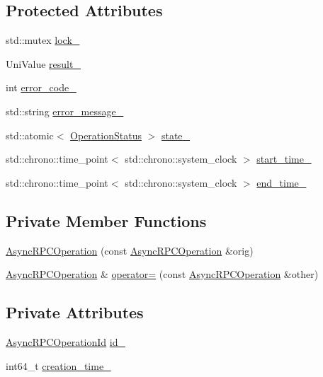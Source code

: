 \subsection*{Protected Attributes}
\begin{DoxyCompactItemize}
\item 
std\+::mutex \mbox{\hyperlink{class_async_r_p_c_operation_a3b2c3593ad11003b628c95dffbbea6d1}{lock\+\_\+}}
\item 
Uni\+Value \mbox{\hyperlink{class_async_r_p_c_operation_abcb878365261b9f28b460d697b39cc12}{result\+\_\+}}
\item 
int \mbox{\hyperlink{class_async_r_p_c_operation_a15823397370b4893f7e0e7aa88efd89e}{error\+\_\+code\+\_\+}}
\item 
std\+::string \mbox{\hyperlink{class_async_r_p_c_operation_a07644a57fdaf6eeb83fcfbeba4f1b3e0}{error\+\_\+message\+\_\+}}
\item 
std\+::atomic$<$ \mbox{\hyperlink{asyncrpcoperation_8h_ac36eba6558c325a3ae9853d551326ff6}{Operation\+Status}} $>$ \mbox{\hyperlink{class_async_r_p_c_operation_a6f48909669cc4f503d448f14ed6f5da7}{state\+\_\+}}
\item 
std\+::chrono\+::time\+\_\+point$<$ std\+::chrono\+::system\+\_\+clock $>$ \mbox{\hyperlink{class_async_r_p_c_operation_a7ebcc576bfa71f5224b25c82d95a5790}{start\+\_\+time\+\_\+}}
\item 
std\+::chrono\+::time\+\_\+point$<$ std\+::chrono\+::system\+\_\+clock $>$ \mbox{\hyperlink{class_async_r_p_c_operation_aa1be6b3ef1c1d1ffcbbe0b55a45df5e1}{end\+\_\+time\+\_\+}}
\end{DoxyCompactItemize}
\subsection*{Private Member Functions}
\begin{DoxyCompactItemize}
\item 
\mbox{\hyperlink{class_async_r_p_c_operation_a82650746d52af73698ab10c2d0f7b53a}{Async\+R\+P\+C\+Operation}} (const \mbox{\hyperlink{class_async_r_p_c_operation}{Async\+R\+P\+C\+Operation}} \&orig)
\item 
\mbox{\hyperlink{class_async_r_p_c_operation}{Async\+R\+P\+C\+Operation}} \& \mbox{\hyperlink{class_async_r_p_c_operation_a2e741b291d755892418ef01506e28695}{operator=}} (const \mbox{\hyperlink{class_async_r_p_c_operation}{Async\+R\+P\+C\+Operation}} \&other)
\end{DoxyCompactItemize}
\subsection*{Private Attributes}
\begin{DoxyCompactItemize}
\item 
\mbox{\hyperlink{asyncrpcoperation_8h_a1fb3337bad8503e6f6823aa1bcd7191c}{Async\+R\+P\+C\+Operation\+Id}} \mbox{\hyperlink{class_async_r_p_c_operation_ac0e2c643b776bbf357643d091f3ee406}{id\+\_\+}}
\item 
int64\+\_\+t \mbox{\hyperlink{class_async_r_p_c_operation_a472604f84939dea568d04605cee634b9}{creation\+\_\+time\+\_\+}}
\end{DoxyCompactItemize}



